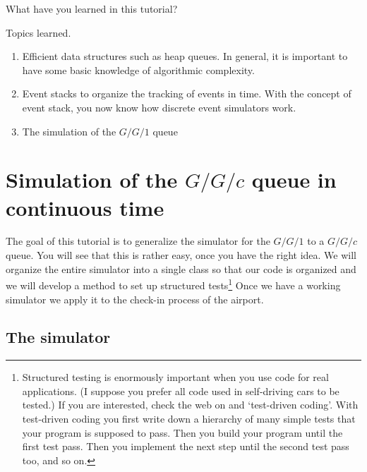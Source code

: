 \begin{exercise}
  What have you learned in this tutorial?
  \begin{solution}
    Topics learned.
    \begin{enumerate}
    \item Efficient data structures such as heap queues. In general, it is important to have some basic knowledge of algorithmic complexity. 
    \item Event stacks to organize the tracking of events in time. With the concept of event stack, you now know how discrete event simulators work. 
    \item The simulation of the $G/G/1$ queue
    \end{enumerate}
  \end{solution}
\end{exercise}


\clearpage


\section{Simulation of the $G/G/c$ queue in continuous time}
\label{sec:ggc-continuous-time}

The goal of this tutorial is to  generalize the simulator for the $G/G/1$ to a $G/G/c$ queue. You will see that this is rather easy, once you have the right idea. We will organize the entire simulator into a single class so that our code is organized and we will develop a method to set up structured  tests\footnote{Structured testing is enormously important when you use code for real applications. (I suppose you prefer all code used in self-driving cars to be tested.)  If you are interested, check the web on   and `test-driven coding'. With test-driven coding you first write down a hierarchy of  many simple tests that your program is supposed to pass.  Then you build your program until the first test pass. Then you implement the next step until the second test pass too, and so on.} Once we have a working simulator we apply it to the check-in process of the airport. 



\subsection{The simulator}
\label{sec:simulator}


